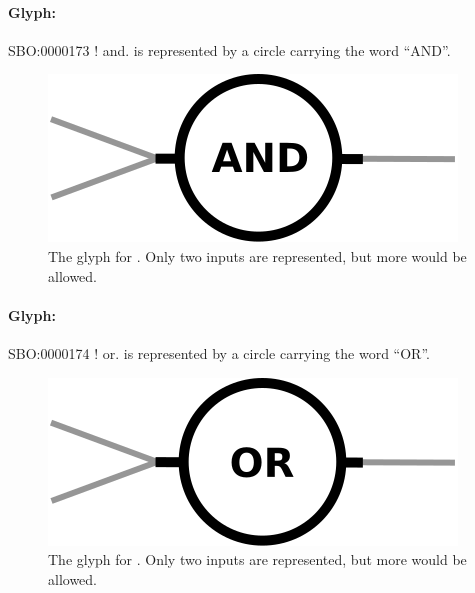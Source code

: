 \paragraph{Glyph: }\label{sec:techref:and}

\begin{glyphDescription}
 \glyphSboTerm SBO:0000173 ! and.
 \glyphNode {} is represented by a circle carrying the word ``AND''.
\end{glyphDescription}

\begin{figure}[htb]
  \centering
  \includegraphics[scale = 0.5]{images/and}
  \caption{The \PD glyph for . Only two inputs are represented, but more would be allowed.}
  \label{fig:techref:and}
\end{figure}


\paragraph{Glyph: }\label{sec:techref:or}

\begin{glyphDescription}
 \glyphSboTerm SBO:0000174 ! or.
 \glyphNode {} is represented by a circle carrying the word ``OR''.
 \end{glyphDescription}

\begin{figure}[htb]
  \centering
  \includegraphics[scale = 0.5]{images/or}
  \caption{The \PD glyph for . Only two inputs are represented, but more would be allowed.}
  \label{fig:techref:or}
\end{figure}


